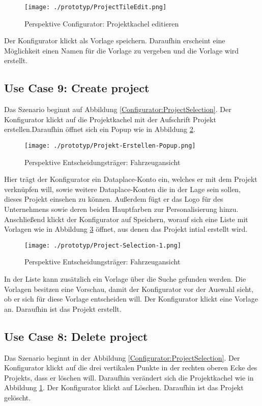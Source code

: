 \begin{figure}[ht]
  \centering
  \texttt{[image: ./prototyp/ProjectTileEdit.png]}
  \caption{Perspektive Configurator: Projektkachel editieren}
  \label{Configurator:ProjectTileEdit}
\end{figure}
Der Konfigurator klickt als Vorlage speichern. Daraufhin erscheint eine Möglichkeit einen Namen für die Vorlage zu vergeben und die Vorlage wird erstellt.

\subsection{Use Case 9: Create project}
Das Szenario beginnt auf Abbildung \ref{Configurator:ProjectSelection}. Der Konfigurator klickt auf die Projektkachel mit der Aufschrift Projekt erstellen.Daraufhin öffnet sich ein Popup wie in Abbildung \ref{Configurator:CreateProjectPopup}. 
\begin{figure}[ht]
  \centering
  \texttt{[image: ./prototyp/Projekt-Erstellen-Popup.png]}
  \caption{Perspektive Entscheidungsträger: Fahrzeugansicht}
  \label{Configurator:CreateProjectPopup}
\end{figure}
Hier trägt der Konfigurator ein Dataplace-Konto ein, welches er mit dem Projekt verknüpfen will, sowie weitere Dataplace-Konten die in der Lage sein sollen, dieses Projekt einsehen zu können. Außerdem fügt er das Logo für des Unternehmens sowie deren beiden Hauptfarben zur Personalisierung hinzu. Anschließend klickt der Konfigurator auf Speichern, worauf sich eine Liste mit Vorlagen wie in Abbildung \ref{Configurator:Template} öffnet, aus denen das Projekt intial erstellt wird.

\begin{figure}[ht]
  \centering
  \texttt{[image: ./prototyp/Project-Selection-1.png]}
  \caption{Perspektive Entscheidungsträger: Fahrzeugansicht}
  \label{Configurator:Template}
\end{figure}
In der Liste kann zusätzlich ein Vorlage über die Suche gefunden werden. Die Vorlagen besitzen eine Vorschau, damit der Konfigurator vor der Auswahl sieht, ob er sich für diese Vorlage entscheiden will. Der Konfigurator klickt eine Vorlage an. Daraufhin ist das Projekt erstellt.

\subsection{Use Case 8: Delete project}
Das Szenario beginnt in der Abbildung \ref{Configurator:ProjectSelection}. Der Konfigurator klickt auf die drei vertikalen Punkte in der rechten oberen Ecke des Projekts, dass er löschen will. Daraufhin verändert sich die Projektkachel wie in Abbildung \ref{Configurator:ProjectTileEdit}. Der Konfigurator klickt auf Löschen. Daraufhin ist das Projekt gelöscht.

